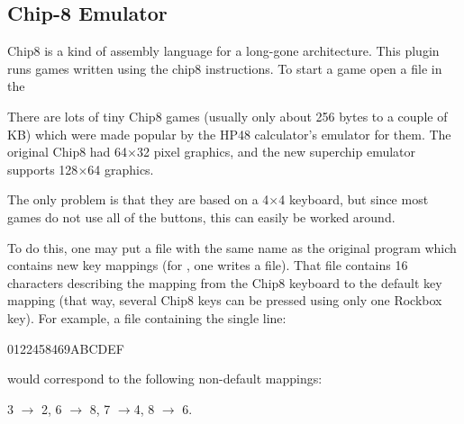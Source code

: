 \subsection{\label{ref:Chip8emulator}Chip{}-8 Emulator}
Chip8 is a kind of assembly language for a long-gone architecture.
This plugin runs games written using the chip8 instructions.
To start a game open a  file in the 

There are lots of tiny Chip8 games (usually only about 256 bytes to a
couple of KB) which were made popular by the HP48
calculator's emulator for them. The original Chip8 had
64$\times$32 pixel graphics, and the new superchip emulator supports 128$\times$64
graphics.

The only problem is that they are based on a 4$\times$4 keyboard, but since most
games do not use all of the buttons, this can easily be worked around.


To do this, one may put a  file with the same name as the
original program which contains new key mappings (for , one
writes a  file). That  file contains 16
characters describing the mapping from the Chip8 keyboard to the default key
mapping (that way, several Chip8 keys can be pressed using only one
Rockbox key). For example, a file containing the single line:
\begin{code}
    0122458469ABCDEF
\end{code}
would correspond to the following non-default mappings:

3 $\rightarrow$ 2, 6 $\rightarrow$ 8, 7 $\rightarrow$4, 8 $\rightarrow$ 6.

